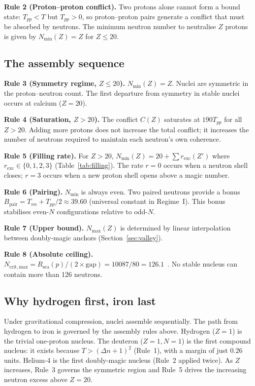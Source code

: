 \documentclass{article}
\theoremstyle{remark}
\newcommand{\Rsea}{R_{\mathrm{sea}}}
\newcommand{\Tpp}{T_{pp}}
\newcommand{\Tnn}{T_{nn}}
\newcommand{\Nmin}{N_{\min}}
\newcommand{\Nmax}{N_{\max}}
\newcommand{\Deltanop}{\Delta n}
\newcommand{\Bpair}{B_{\mathrm{pair}}}
\begin{document}
\textbf{Rule 2 (Proton--proton conflict).} Two protons alone cannot form a bound state: $\Tpp < T$ but $\Tpp > 0$, so proton--proton pairs generate a conflict that must be absorbed by neutrons. The minimum neutron number to neutralise $Z$ protons is given by $\Nmin(Z) = Z$ for $Z \leq 20$.

\subsection{The assembly sequence}

\textbf{Rule 3 (Symmetry regime, $Z \leq 20$).} $\Nmin(Z) = Z$. Nuclei are symmetric in the proton--neutron count. The first departure from symmetry in stable nuclei occurs at calcium ($Z = 20$).

\textbf{Rule 4 (Saturation, $Z > 20$).} The conflict $C(Z)$ saturates at $190\Tpp$ for all $Z > 20$. Adding more protons does not increase the total conflict; it increases the number of neutrons required to maintain each neutron's own coherence.

\textbf{Rule 5 (Filling rate).} For $Z > 20$, $\Nmin(Z) = 20 + \sum r_{\mathrm{exc}}(Z')$ where $r_{\mathrm{exc}} \in \{0,1,2,3\}$ (Table~\ref{tab:filling}). The rate $r = 0$ occurs when a neutron shell closes; $r = 3$ occurs when a new proton shell opens above a magic number.

\textbf{Rule 6 (Pairing).} $\Nmin$ is always even. Two paired neutrons provide a bonus $\Bpair = \Tnn + \Tpp/2 \approx 39.60$ (universal constant in Regime~I). This bonus stabilises even-$N$ configurations relative to odd-$N$.

\textbf{Rule 7 (Upper bound).} $\Nmax(Z)$ is determined by linear interpolation between doubly-magic anchors (Section~\ref{sec:valley}).

\textbf{Rule 8 (Absolute ceiling).} $N_{\mathrm{crit,max}} = \Rsea(p)/(2 \times \mathrm{gap}) = 10087/80 = 126.1$~\cite{D22}. No stable nucleus can contain more than 126 neutrons.

\subsection{Why hydrogen first, iron last}

Under gravitational compression, nuclei assemble sequentially. The path from hydrogen to iron is governed by the assembly rules above. Hydrogen ($Z=1$) is the trivial one-proton nucleus. The deuteron ($Z=1, N=1$) is the first compound nucleus: it exists because $T > (\Deltanop+1)^2$ (Rule~1), with a margin of just $0.26$ units. Helium-4 is the first doubly-magic nucleus (Rule~2 applied twice). As $Z$ increases, Rule~3 governs the symmetric region and Rule~5 drives the increasing neutron excess above $Z = 20$.
\end{document}
